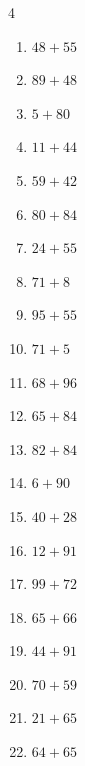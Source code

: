 \begin{multicols}{4}
\begin{enumerate}
  \item $48+55$
        \phantom{$=103$}

  \item $89+48$
        \phantom{$=137$}

  \item $5+80$
        \phantom{$=85$}

  \item $11+44$
        \phantom{$=55$}

  \item $59+42$
        \phantom{$=101$}

  \item $80+84$
        \phantom{$=164$}

  \item $24+55$
        \phantom{$=79$}

  \item $71+8$
        \phantom{$=79$}

  \item $95+55$
        \phantom{$=150$}

  \item $71+5$
        \phantom{$=76$}

  \item $68+96$
        \phantom{$=164$}

  \item $65+84$
        \phantom{$=149$}

  \item $82+84$
        \phantom{$=166$}

  \item $6+90$
        \phantom{$=96$}

  \item $40+28$
        \phantom{$=68$}

  \item $12+91$
        \phantom{$=103$}

  \item $99+72$
        \phantom{$=171$}

  \item $65+66$
        \phantom{$=131$}

  \item $44+91$
        \phantom{$=135$}

  \item $70+59$
        \phantom{$=129$}

  \item $21+65$
        \phantom{$=86$}

  \item $64+65$
        \phantom{$=129$}


\end{enumerate}
\end{multicols}
